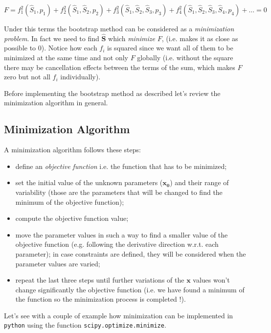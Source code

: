 \begin{equation}
F = f_1^2(\hat{S}_1,p_1) + f_2^2(\hat{S}_1, \hat{S}_2,p_2) + f_3^2(\hat{S}_1, \hat{S}_2, \hat{S}_3,p_3) + f_4^2(\hat{S}_1, \hat{S}_2, \hat{S}_3, \hat{S}_4,p_4) + \ldots = 0
\label{eq:bootstrap_as_minimization}
\end{equation}

Under this terms the bootstrap method can be considered as a \emph{minimization problem}. In fact we need to find $\mathbf{\hat{S}}$ which \emph{minimize} $F$, (i.e. makes it as close as possible to 0).
Notice how each \(f_i\) is squared since we want all of them to be minimized at the same time and not only \(F\) globally (i.e. without the square there may be cancellation effects between the terms of the sum, which makes $F$ zero but not all $f_i$ individually).

Before implementing the bootstrap method as described let's review the minimization algorithm in general.

\subsection{Minimization Algorithm}
\label{minimization-algorithm}

A minimization algorithm follows these steps:

\begin{itemize}
\tightlist
\item
  define an \emph{objective function} i.e. the function that has to be minimized;
\item
  set the initial value of the unknown parameters (\(\mathbf{x_0}\)) and their range of variability (those are the parameters that will be changed to find the minimum of the objective function);
\item
  compute the objective function value;
\item
  move the parameter values in such a way to find a smaller value of the objective function (e.g. following the derivative direction w.r.t. each parameter); in case constraints are defined, they will be considered when the parameter values are varied;
\item
  repeat the last three steps until further variations of the \(\mathbf{x}\) values won't change significantly the objective
  function (i.e. we have found a minimum of the function so the minimization process is completed !).
\end{itemize}

Let's see with a couple of example how minimization can be implemented in \texttt{python} using the function \texttt{scipy.optimize.minimize}.

